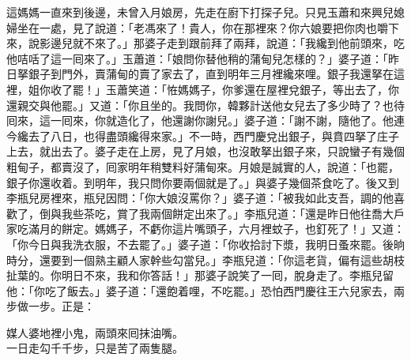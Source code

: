這媽媽一直來到後邊，未曾入月娘房，先走在廚下打探子兒。只見玉蕭和來興兒媳婦坐在一處，見了說道：「老馮來了！貴人，你在那裡來？你六娘要把你肉也嚼下來，說影邊兒就不來了。」那婆子走到跟前拜了兩拜，說道：「我纔到他前頭來，吃他咭咶了這一囘來了。」玉蕭道：「娘問你替他稍的蒲甸兒怎樣的？」婆子道：「昨日拏銀子到門外，賣蒲甸的賣了家去了，直到明年三月裡纔來哩。銀子我還拏在這裡，姐你收了罷！」玉蕭笑道：「恠媽媽子，你爹還在屋裡兌銀子，等出去了，你還親交與他罷。」又道：「你且坐的。我問你，韓夥計送他女兒去了多少時了？也待囘來，這一囘來，你就造化了，他還謝你謝兒。」婆子道：「謝不謝，隨他了。他連今纔去了八日，也得盡頭纔得來家。」不一時，西門慶兌出銀子，與賁四拏了庄子上去，就出去了。婆子走在上房，見了月娘，也沒敢拏出銀子來，只說蠻子有幾個粗甸子，都賣沒了，囘家明年稍雙料好蒲甸來。月娘是誠實的人，說道：「也罷，銀子你還收着。到明年，我只問你要兩個就是了。」與婆子幾個茶食吃了。後又到李瓶兒房裡來，瓶兒因問：「你大娘沒罵你？」婆子道：「被我如此支吾，調的他喜歡了，倒與我些茶吃，賞了我兩個餅定出來了。」李瓶兒道：「還是昨日他往喬大戶家吃滿月的餅定。媽媽子，不虧你這片嘴頭子，六月裡蚊子，也釘死了！」又道：「你今日與我洗衣服，不去罷了。」婆子道：「你收拾討下漿，我明日蚤來罷。後晌時分，還要到一個熟主顧人家幹些勾當兒。」李瓶兒道：「你這老貨，偏有這些胡枝扯葉的。你明日不來，我和你答話！」那婆子說笑了一囘，脫身走了。李瓶兒留他：「你吃了飯去。」婆子道：「還飽着哩，不吃罷。」恐怕西門慶往王六兒家去，兩步做一步。正是：

\begin{myquote}
媒人婆地裡小鬼，兩頭來囘抹油嘴。\\一日走勾千千步，只是苦了兩隻腿。
\end{myquote}

